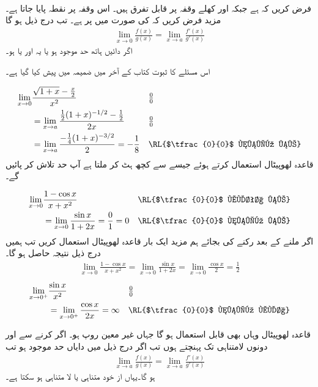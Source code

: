 \\
فرض کریں کہ  ہے جبکہ    اور  کھلے وقفہ   پر قابل تفرق ہیں۔ اس وقفہ پر نقطہ  پایا جاتا ہے۔مزید فرض کریں کہ  کی صورت میں  پر  ہے۔ تب درج ذیل ہو گا
\begin{align}
\lim_{x\to 0}\frac{f(x)}{g(x)}=\lim_{x\to a}\frac{f'(x)}{g'(x)}
\end{align}
اگر دائیں ہاتھ حد موجود ہو یا یہ  اور یا  ہو۔

اس مسئلے کا ثبوت کتاب کے آخر میں ضمیمہ میں پیش کیا گیا ہے۔ 

\begin{align*}
\lim_{x\to 0}&\frac{\sqrt{1+x}-\tfrac{x}{2}}{x^2}&&\tfrac{0}{0}\\
&=\lim_{x\to a}\frac{\tfrac{1}{2}(1+x)^{-1/2}-\tfrac{1}{2}}{2x}&&\tfrac{0}{0}\\
&=\lim_{x\to a}\frac{-\tfrac{1}{4}(1+x)^{-3/2}}{2}=-\frac{1}{8}&&\text{\RL{$\tfrac{0}{0}$ نہیں ہے}}
\end{align*}
قاعدہ لھوپیٹال استعمال کرتے ہوئے جیسے   سے کچھ ہٹ کر ملتا ہے آپ حد تلاش کر پائیں گے۔

\begin{align*}
\lim_{x\to 0}&\frac{1-\cos x}{x+x^2}&&\text{\RL{$\tfrac{0}{0}$ ملتا ہے}}\\
&=\lim_{x\to 0}\frac{\sin x}{1+2x}=\frac{0}{1}=0&&\text{\RL{$\tfrac{0}{0}$ نہیں ہے}}
\end{align*}
اگر  ملنے کے بعد رکنے کی بجائے ہم مزید ایک بار قاعدہ لھوپیٹال استعمال کریں تب ہمیں درج ذیل  نتیجہ حاصل ہو گا۔
\begin{align*}
\lim_{x\to0}\frac{1-\cos x}{x+x^2}=\lim_{x\to 0}\frac{\sin x}{1+2x}=\lim_{x\to 0}\frac{\cos x}{2}=\frac{1}{2}
\end{align*} 
\begin{align*}
\lim_{x\to 0^+}&\frac{\sin x}{x^2}&&\tfrac{0}{0}\\
&=\lim_{x\to 0^+}\frac{\cos x}{2x}=\infty&&\text{\RL{$\tfrac{0}{0}$ نہیں ملا}}
\end{align*}

قاعدہ لھوپیٹال وہاں بھی قابل استعمال ہو گا جہاں غیر معین روپ  ہو۔ اگر  کرنے سے  اور  دونوں لامتناہی تک پہنچتے ہوں تب اگر درج ذیل میں دایاں حد موجود ہو تب
\begin{align*}
\lim_{x\to a}\frac{f(x)}{g(x)}=\lim_{x\to a}\frac{f'(x)}{g'(x)}
\end{align*}
ہو گا۔یہاں  از خود متناہی یا لا متناہی ہو سکتا ہے۔

